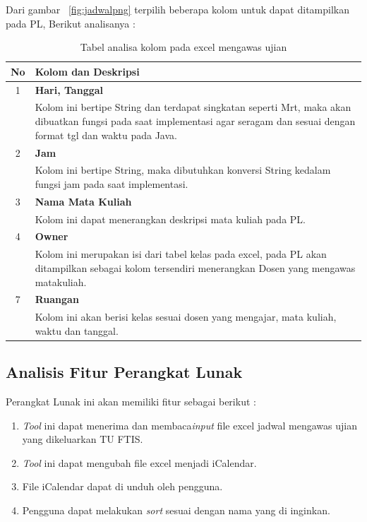 Dari gambar ~\ref{fig:jadwalpng} terpilih beberapa kolom untuk dapat ditampilkan pada PL, Berikut analisanya :
\begin{table}[H]
		\centering
		\caption{Tabel analisa kolom pada excel mengawas ujian}
		\label{tab:analisa_kolom}
\begin{tabular}{|c|p{12cm}|}
		\hline
		\textbf{No} & \textbf{Kolom dan Deskripsi} \\ \hline \hline
		1 & \textbf{Hari, Tanggal}\\
			&	Kolom ini bertipe String dan terdapat singkatan seperti Mrt, maka akan dibuatkan fungsi pada saat implementasi agar seragam dan sesuai dengan format tgl dan waktu pada Java.\\ \hline	
		2 & \textbf{Jam}\\
			&	Kolom ini bertipe String, maka dibutuhkan konversi String kedalam fungsi jam pada saat implementasi.\\ \hline
		3 & \textbf{Nama Mata Kuliah}\\
			&	Kolom ini dapat menerangkan deskripsi mata kuliah pada PL.\\ \hline
		4 & \textbf{Owner}\\
			&	Kolom ini merupakan isi dari tabel kelas pada excel, pada PL akan ditampilkan sebagai kolom tersendiri menerangkan Dosen yang mengawas matakuliah.\\ \hline		
		7 & \textbf{Ruangan}\\
			&	Kolom ini akan berisi kelas sesuai dosen yang mengajar, mata kuliah, waktu dan tanggal.\\ \hline
	\end{tabular}
\end{table}

\subsection{Analisis Fitur Perangkat Lunak}
Perangkat Lunak ini akan memiliki fitur sebagai berikut : 
	\begin{enumerate}
		\item \textit{Tool} ini dapat menerima dan membaca\textit{input} file excel jadwal mengawas ujian yang dikeluarkan TU FTIS.
		\item \textit{Tool} ini dapat mengubah file excel menjadi iCalendar.
		\item File iCalendar dapat di unduh oleh pengguna.
		\item Pengguna dapat melakukan \textit{sort} sesuai dengan nama yang di inginkan.
	\end{enumerate}
	
